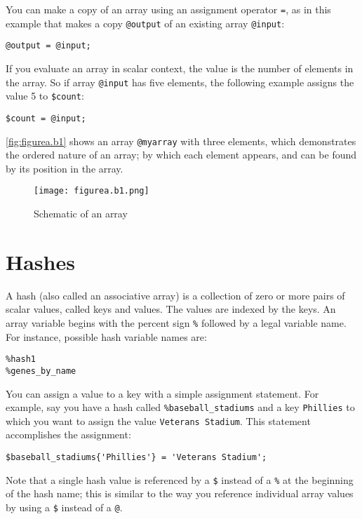 You can make a copy of an array using an assignment operator \verb|=|, as in this example that makes a copy \verb|@output| of an existing array \verb|@input|: 

\begin{lstlisting}
@output = @input;
\end{lstlisting}

If you evaluate an array in scalar context, the value is the number of elements in the array. So if array \verb|@input| has five elements, the following example assigns the value 5 to \verb|$count|: 

\begin{lstlisting}
$count = @input;
\end{lstlisting}

\autoref{fig:figurea.b1} shows an array \verb|@myarray| with three elements, which demonstrates the ordered nature of an array; by which each element appears, and can be found by its position in the array. 

\begin{figure}
  \centering
  \texttt{[image: figurea.b1.png]}
  \caption{Schematic of an array}
  \label{fig:figurea.b1}
 \end{figure}{}

\section{Hashes}
A hash (also called an associative array) is a collection of zero or more pairs of scalar values, called keys and values. The values are indexed by the keys. An array variable begins with the percent sign \verb|%| followed by a legal variable name. For instance, possible hash variable names are:

\begin{lstlisting}
%hash1
%genes_by_name
\end{lstlisting}

You can assign a value to a key with a simple assignment statement. For example, say you have a hash called \verb|%baseball_stadiums| and a key \verb|Phillies| to which you want to assign the value \verb|Veterans Stadium|. This statement accomplishes the assignment:

\begin{lstlisting}
$baseball_stadiums{'Phillies'} = 'Veterans Stadium';
\end{lstlisting}

Note that a single hash value is referenced by a \verb|$| instead of a \verb|%| at the beginning of the hash name; this is similar to the way you reference individual array values by using a \verb|$| instead of a \verb|@|.

